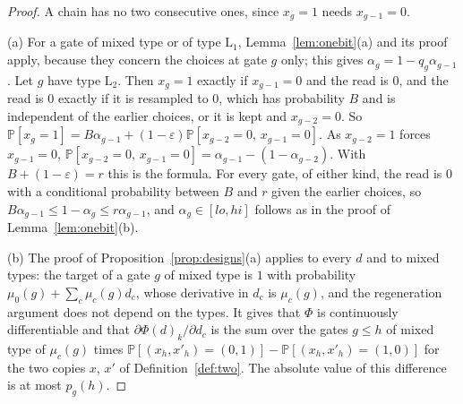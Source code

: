 \documentclass[11pt]{amsart}
\theoremstyle{definition}
\theoremstyle{remark}
\newcommand{\eps}{\varepsilon}
\newcommand{\PP}{\mathbb{P}}
\begin{document}
\begin{proof}
A chain has no two consecutive ones, since $x_g=1$ needs $x_{g-1}=0$.

(a) For a gate of mixed type or of type $\mathrm L_1$, Lemma~\ref{lem:onebit}(a) and its proof
apply, because they concern the choices at gate $g$ only; this gives $\alpha_g=1-q_g\alpha_{g-1}$.
Let $g$ have type $\mathrm L_2$. Then $x_g=1$ exactly if $x_{g-1}=0$ and the read is $0$, and the
read is $0$ exactly if it is resampled to $0$, which has probability $B$ and is independent of
the earlier choices, or it is kept and $x_{g-2}=0$. So
$\PP[x_g=1]=B\alpha_{g-1}+(1-\eps)\PP[x_{g-2}=0,\,x_{g-1}=0]$. As $x_{g-2}=1$ forces $x_{g-1}=0$,
$\PP[x_{g-2}=0,\,x_{g-1}=0]=\alpha_{g-1}-(1-\alpha_{g-2})$. With $B+(1-\eps)=r$ this is the
formula. For every gate, of either kind, the read is $0$ with a conditional probability between
$B$ and $r$ given the earlier choices, so $B\alpha_{g-1}\le1-\alpha_g\le r\alpha_{g-1}$, and
$\alpha_g\in[lo,hi]$ follows as in the proof of Lemma~\ref{lem:onebit}(b).

(b) The proof of Proposition~\ref{prop:designs}(a) applies to every $d$ and to mixed types: the
target of a gate $g$ of mixed type is $1$ with probability $\mu_0(g)+\sum_c\mu_c(g)d_c$, whose
derivative in $d_c$ is $\mu_c(g)$, and the regeneration argument does not depend on the types.
It gives that $\Phi$ is continuously differentiable and that $\partial\Phi(d)_k/\partial d_c$ is
the sum over the gates $g\le h$ of mixed type of $\mu_c(g)$ times
$\PP[(x_h,x'_h)=(0,1)]-\PP[(x_h,x'_h)=(1,0)]$ for the two copies $x$, $x'$ of
Definition~\ref{def:two}. The absolute value of this difference is at most $p_g(h)$.


\end{proof}
\end{document}

